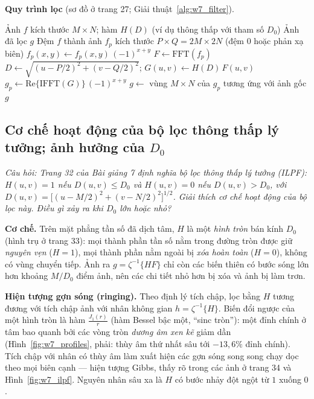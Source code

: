 \textbf{Quy trình lọc} (sơ đồ ở trang 27; Giải thuật~\ref{alg:w7_filter}).

\begin{algorithm}[ht]
\caption{Lọc ảnh trong miền tần số}
\label{alg:w7_filter}
\begin{algorithmic}[1]
\Require Ảnh $f$ kích thước $M \times N$; hàm $H(D)$ (ví dụ thông thấp với tham số $D_0$)
\Ensure Ảnh đã lọc $g$
\State Đệm $f$ thành ảnh $f_p$ kích thước $P \times Q = 2M \times 2N$ (đệm $0$ hoặc phản xạ biên) 
\State $f_p(x, y) \gets f_p(x, y)\,(-1)^{x + y}$ 
\State $F \gets \mathrm{FFT}(f_p)$
 \State $D \gets \sqrt{(u - P/2)^2 + (v - Q/2)^2}$; \quad $G(u, v) \gets H(D)\,F(u, v)$ \EndFor
\State $g_p \gets \mathrm{Re}\{\mathrm{IFFT}(G)\}\,(-1)^{x + y}$ 
\State $g \gets$ vùng $M \times N$ của $g_p$ tương ứng với ảnh gốc
\State \Return $g$
\end{algorithmic}
\end{algorithm}

\subsection{Cơ chế hoạt động của bộ lọc thông thấp lý tưởng; ảnh hưởng của \texorpdfstring{$D_0$}{D0}}
\label{subsec:w7_ilpf}

\textit{Câu hỏi: Trang 32 của Bài giảng 7 định nghĩa bộ lọc thông thấp lý tưởng (ILPF): $H(u, v) = 1$ nếu $D(u, v) \le D_0$ và $H(u, v) = 0$ nếu $D(u, v) > D_0$, với $D(u, v) = \big[(u - M/2)^2 + (v - N/2)^2\big]^{1/2}$. Giải thích cơ chế hoạt động của bộ lọc này. Điều gì xảy ra khi $D_0$ lớn hoặc nhỏ?}

\textbf{Cơ chế.} Trên mặt phẳng tần số đã dịch tâm, $H$ là một \emph{hình tròn} bán kính $D_0$ (hình trụ ở trang 33): mọi thành phần tần số nằm trong đường tròn được giữ \emph{nguyên vẹn} ($H = 1$), mọi thành phần nằm ngoài bị \emph{xóa hoàn toàn} ($H = 0$), không có vùng chuyển tiếp. Ảnh ra $g = \zeta^{-1}\{H F\}$ chỉ còn các biến thiên có bước sóng lớn hơn khoảng $M/D_0$ điểm ảnh, nên các chi tiết nhỏ hơn bị xóa và ảnh bị làm trơn.

\textbf{Hiện tượng gợn sóng (ringing).} Theo định lý tích chập, lọc bằng $H$ tương đương với tích chập ảnh với nhân không gian $h = \zeta^{-1}\{H\}$. Biến đổi ngược của một hình tròn là hàm $\frac{J_1(r)}{r}$ (hàm Bessel bậc một, ``sinc tròn''): một đỉnh chính ở tâm bao quanh bởi các vòng tròn \emph{dương âm xen kẽ} giảm dần (Hình~\ref{fig:w7_profiles}, phải: thùy âm thứ nhất sâu tới $-13{,}6\%$ đỉnh chính). Tích chập với nhân có thùy âm làm xuất hiện các gợn sóng song song chạy dọc theo mọi biên cạnh — hiện tượng Gibbs, thấy rõ trong các ảnh ở trang 34 và Hình~\ref{fig:w7_ilpf}. Nguyên nhân sâu xa là $H$ có bước nhảy đột ngột từ $1$ xuống $0$.

